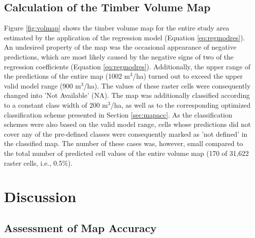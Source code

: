 \subsection{Calculation of the Timber Volume Map}
\label{sec:mapcalc}

Figure \ref{fig:volmap} shows the timber volume map for the entire study area estimated by the application of the regression model (Equation \ref{eq:regmodres}). An undesired property of the map was the occasional appearance of negative predictions, which are most likely caused by the negative signs of two of the regression coefficients (Equation \ref{eq:regmodres}). Additionally, the upper range of the predictions of the entire map (1002 m$^3$/ha) turned out to exceed the upper valid model range (900 m$^3$/ha). The values of these raster cells were consequently changed into 'Not Available' (NA). The map was additionally classified according to a constant class width of 200 m$^3$/ha, as well as to the corresponding optimized classification scheme presented in Section \ref{sec:mapacc}. As the classification schemes were also based on the valid model range, cells whose predictions did not cover any of the pre-defined classes were consequently marked as 'not defined' in the classified map. The number of these cases was, however, small compared to the total number of predicted cell values of the entire volume map (170 of 31,622 raster cells, i.e., 0.5\%).


\section{Discussion}
\label{sec:disc}

\subsection{Assessment of Map Accuracy}
\label{sec:mapaccass}

